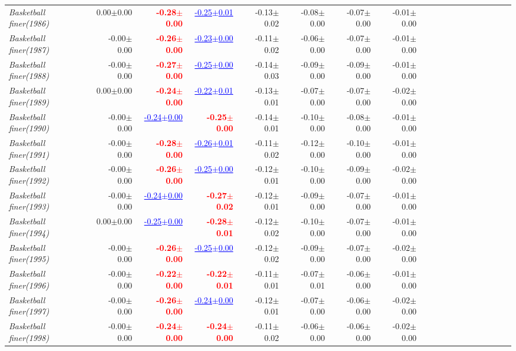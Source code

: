 \documentclass[nohyperref]{article}
\theoremstyle{plain}
\theoremstyle{definition}
\theoremstyle{remark}
\newcommand{\red}[1]{\textcolor{red}{\textbf{#1}}}
\newcommand{\blue}[1]{\textcolor{blue}{\underline{#1}}}
\begin{document}
\begin{table*}[!ht]
{\begin{tabular}{lrrrrrrrrrrrrrrrrrr}
			{\it Basketball finer(1986)} & 0.00$\pm$0.00 & \red{-0.28$\pm$0.00} & \blue{-0.25$\pm$0.01} & -0.13$\pm$0.02 & -0.08$\pm$0.00 & -0.07$\pm$0.00 & -0.01$\pm$0.00 \\
			{\it Basketball finer(1987)} & -0.00$\pm$0.00 & \red{-0.26$\pm$0.00} & \blue{-0.23$\pm$0.00} & -0.11$\pm$0.02 & -0.06$\pm$0.00 & -0.07$\pm$0.00 & -0.01$\pm$0.00 \\
			{\it Basketball finer(1988)} & -0.00$\pm$0.00 & \red{-0.27$\pm$0.00} & \blue{-0.25$\pm$0.00} & -0.14$\pm$0.03 & -0.09$\pm$0.00 & -0.09$\pm$0.00 & -0.01$\pm$0.00 \\
			{\it Basketball finer(1989)} & 0.00$\pm$0.00 & \red{-0.24$\pm$0.00} & \blue{-0.22$\pm$0.01} & -0.13$\pm$0.01 & -0.07$\pm$0.00 & -0.07$\pm$0.00 & -0.02$\pm$0.00 \\
			{\it Basketball finer(1990)} & -0.00$\pm$0.00 & \blue{-0.24$\pm$0.00} & \red{-0.25$\pm$0.00} & -0.14$\pm$0.01 & -0.10$\pm$0.00 & -0.08$\pm$0.00 & -0.01$\pm$0.00 \\
			{\it Basketball finer(1991)} & -0.00$\pm$0.00 & \red{-0.28$\pm$0.00} & \blue{-0.26$\pm$0.01} & -0.11$\pm$0.02 & -0.12$\pm$0.00 & -0.10$\pm$0.00 & -0.01$\pm$0.00 \\
			{\it Basketball finer(1992)} & -0.00$\pm$0.00 & \red{-0.26$\pm$0.00} & \blue{-0.25$\pm$0.00} & -0.12$\pm$0.01 & -0.10$\pm$0.00 & -0.09$\pm$0.00 & -0.02$\pm$0.00 \\
			{\it Basketball finer(1993)} & -0.00$\pm$0.00 & \blue{-0.24$\pm$0.00} & \red{-0.27$\pm$0.02} & -0.12$\pm$0.01 & -0.09$\pm$0.00 & -0.07$\pm$0.00 & -0.01$\pm$0.00 \\
			{\it Basketball finer(1994)} & 0.00$\pm$0.00 & \blue{-0.25$\pm$0.00} & \red{-0.28$\pm$0.01} & -0.12$\pm$0.02 & -0.10$\pm$0.00 & -0.07$\pm$0.00 & -0.01$\pm$0.00 \\
			{\it Basketball finer(1995)} & -0.00$\pm$0.00 & \red{-0.26$\pm$0.00} & \blue{-0.25$\pm$0.00} & -0.12$\pm$0.02 & -0.09$\pm$0.00 & -0.07$\pm$0.00 & -0.02$\pm$0.00 \\
			{\it Basketball finer(1996)} & -0.00$\pm$0.00 & \red{-0.22$\pm$0.00} & \red{-0.22$\pm$0.01} & -0.11$\pm$0.01 & -0.07$\pm$0.01 & -0.06$\pm$0.00 & -0.01$\pm$0.00 \\
			{\it Basketball finer(1997)} & -0.00$\pm$0.00 & \red{-0.26$\pm$0.00} & \blue{-0.24$\pm$0.00} & -0.12$\pm$0.01 & -0.07$\pm$0.00 & -0.06$\pm$0.00 & -0.02$\pm$0.00 \\
			{\it Basketball finer(1998)} & -0.00$\pm$0.00 & \red{-0.24$\pm$0.00} & \red{-0.24$\pm$0.00} & -0.11$\pm$0.02 & -0.06$\pm$0.00 & -0.06$\pm$0.00 & -0.02$\pm$0.00 \\

\end{tabular}}
\end{table*}
\end{document}
